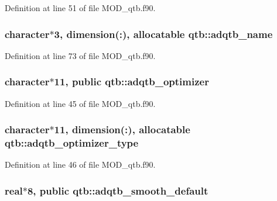 Definition at line 51 of file M\-O\-D\-\_\-qtb.\-f90.

\hypertarget{classqtb_a1a0c930c48a8f13fbff54e36894caa9c}{
\subsubsection[{adqtb\-\_\-name}]{\setlength{\rightskip}{0pt plus 5cm}character$\ast$3, dimension(\-:), allocatable qtb\-::adqtb\-\_\-name}}\label{classqtb_a1a0c930c48a8f13fbff54e36894caa9c}


Definition at line 73 of file M\-O\-D\-\_\-qtb.\-f90.

\hypertarget{classqtb_a5fa4fc71571ec956dd7c4f935e755c4f}{
\subsubsection[{adqtb\-\_\-optimizer}]{\setlength{\rightskip}{0pt plus 5cm}character$\ast$11, public qtb\-::adqtb\-\_\-optimizer}}\label{classqtb_a5fa4fc71571ec956dd7c4f935e755c4f}


Definition at line 45 of file M\-O\-D\-\_\-qtb.\-f90.

\hypertarget{classqtb_a794923263a7ad95cc051d7aff5d1f351}{
\subsubsection[{adqtb\-\_\-optimizer\-\_\-type}]{\setlength{\rightskip}{0pt plus 5cm}character$\ast$11, dimension(\-:), allocatable qtb\-::adqtb\-\_\-optimizer\-\_\-type}}\label{classqtb_a794923263a7ad95cc051d7aff5d1f351}


Definition at line 46 of file M\-O\-D\-\_\-qtb.\-f90.

\hypertarget{classqtb_a777a3ecfccb537a2e3b6bb5c43a49d70}{
\subsubsection[{adqtb\-\_\-smooth\-\_\-default}]{\setlength{\rightskip}{0pt plus 5cm}real$\ast$8, public qtb\-::adqtb\-\_\-smooth\-\_\-default}}\label{classqtb_a777a3ecfccb537a2e3b6bb5c43a49d70}


